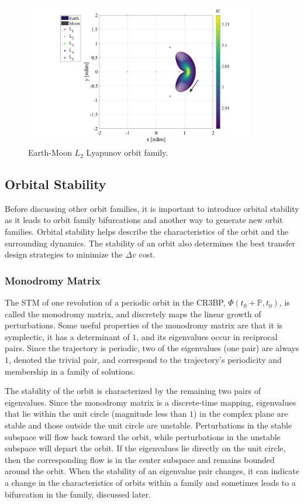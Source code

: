\begin{figure}[ht]
    \centering
    \includegraphics[width=0.9\textwidth]{figures/L2LyapunovFamily.pdf}
    \caption{Earth-Moon $L_{2}$ Lyapunov orbit family.}
    \label{fig:L2Lyapunov}
\end{figure}

\subsection{Orbital Stability}
Before discussing other orbit families, it is important to introduce orbital stability as it leads
to orbit family bifurcations and another way to generate new orbit families. Orbital stability
helps describe the characteristics of the orbit and the surrounding dynamics. The stability of an
orbit also determines the best transfer design strategies to minimize the $\Delta v$ cost. 

\subsubsection{Monodromy Matrix}
The STM of one revolution of a periodic orbit in the CR3BP, $\Phi(t_{0}+\mathbb{P},t_{0})$, is
called the monodromy matrix, and discretely maps the linear growth of perturbations. Some
useful properties of the monodromy matrix are that it is symplectic, it has a determinant of $1$,
and its eigenvalues occur in reciprocal pairs\cite{ZimovanSpreen:2021}. Since the trajectory is
periodic, two of the eigenvalues (one pair) are always $1$, denoted the trivial pair, and
correspond to the trajectory's periodicity and membership in a family of solutions.

The stability of the orbit is characterized by the remaining two pairs of eigenvalues. Since the
monodromy matrix is a discrete-time mapping, eigenvalues that lie within the unit circle (magnitude
less than $1$) in the complex plane are stable and those outside the unit circle are unstable.
Perturbations in the stable subspace will flow back toward the orbit, while perturbations in the
unstable subspace will depart the orbit. If the eigenvalues lie directly on the unit circle, then
the corresponding flow is in the center subspace and remains bounded around the orbit. When the
stability of an eigenvalue pair changes, it can indicate a change in the characteristics of orbits
within a family and sometimes leads to a bifurcation in the family, discussed later.

